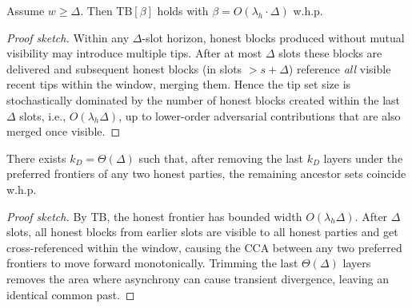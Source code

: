 \begin{theorem}
\label{thm:base-TB}
Assume $w\ge \Delta$. Then $\mathrm{TB}[\beta]$ holds with $\beta=O(\lambda_h\cdot \Delta)$ w.h.p.
\end{theorem}
\begin{proof}[Proof sketch]
Within any $\Delta$-slot horizon, honest blocks produced without mutual visibility may introduce multiple tips. After at most $\Delta$ slots these blocks are delivered and subsequent honest blocks (in slots $>s{+}\Delta$) reference \emph{all} visible recent tips within the window, merging them. Hence the tip set size is stochastically dominated by the number of honest blocks created within the last $\Delta$ slots, i.e., $O(\lambda_h\Delta)$, up to lower-order adversarial contributions that are also merged once visible.
\end{proof}

\begin{theorem}
\label{thm:base-DCP}
There exists $k_D=\Theta(\Delta)$ such that, after removing the last $k_D$ layers under the preferred frontiers of any two honest parties, the remaining ancestor sets coincide w.h.p.
\end{theorem}
\begin{proof}[Proof sketch]
By TB, the honest frontier has bounded width $O(\lambda_h\Delta)$. After $\Delta$ slots, all honest blocks from earlier slots are visible to all honest parties and get cross-referenced within the window, causing the CCA between any two preferred frontiers to move forward monotonically. Trimming the last $\Theta(\Delta)$ layers removes the area where asynchrony can cause transient divergence, leaving an identical common past.
\end{proof}

